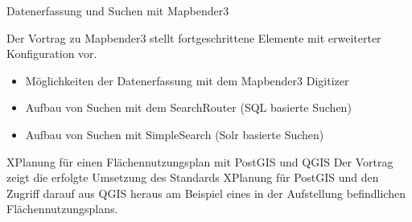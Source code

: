 %
{Datenerfassung und Suchen mit Mapbender3}%
{}%
{Der Vortrag zu Mapbender3 stellt fortgeschrittene Elemente mit erweiterter Konfiguration vor. 
\begin{itemize}
 \item Möglichkeiten der Datenerfassung mit dem Mapbender3 Digitizer
 \item Aufbau von Suchen mit dem SearchRouter (SQL basierte Suchen)
 \item Aufbau von Suchen mit SimpleSearch (Solr basierte Suchen)
\end{itemize}%
}

%
{XPlanung für einen Flächennutzungsplan mit PostGIS und QGIS}%
{}%
{Der Vortrag zeigt die erfolgte Umsetzung des Standards XPlanung für PostGIS und den Zugriff darauf aus
QGIS heraus am Beispiel eines in der Aufstellung befindlichen Flächennutzungsplans. }



